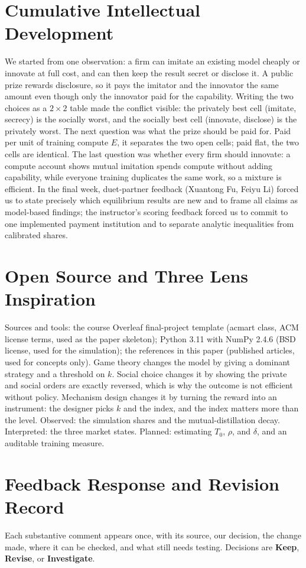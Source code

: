 \section{Cumulative Intellectual Development}
We started from one observation: a firm can imitate an existing model cheaply or innovate at full cost, and can then keep the result secret or disclose it. A public prize rewards disclosure, so it pays the imitator and the innovator the same amount even though only the innovator paid for the capability. Writing the two choices as a $2\times2$ table made the conflict visible: the privately best cell (imitate, secrecy) is the socially worst, and the socially best cell (innovate, disclose) is the privately worst. The next question was what the prize should be paid for. Paid per unit of training compute $E$, it separates the two open cells; paid flat, the two cells are identical. The last question was whether every firm should innovate: a compute account shows mutual imitation spends compute without adding capability, while everyone training duplicates the same work, so a mixture is efficient. In the final week, duet-partner feedback (Xuantong Fu, Feiyu Li) forced us to state precisely which equilibrium results are new and to frame all claims as model-based findings; the instructor's scoring feedback forced us to commit to one implemented payment institution and to separate analytic inequalities from calibrated shares.

\section{Open Source and Three Lens Inspiration}
Sources and tools: the course Overleaf final-project template (acmart class, ACM license terms, used as the paper skeleton); Python 3.11 with NumPy 2.4.6 (BSD license, used for the simulation); the references in this paper (published articles, used for concepts only). Game theory changes the model by giving a dominant strategy and a threshold on $k$. Social choice changes it by showing the private and social orders are exactly reversed, which is why the outcome is not efficient without policy. Mechanism design changes it by turning the reward into an instrument: the designer picks $k$ and the index, and the index matters more than the level. Observed: the simulation shares and the mutual-distillation decay. Interpreted: the three market states. Planned: estimating $T_0$, $\rho$, and $\delta$, and an auditable training measure.

\section{Feedback Response and Revision Record}\label{app:response}
Each substantive comment appears once, with its source, our decision, the change made, where it can be checked, and what still needs testing. Decisions are \textbf{Keep}, \textbf{Revise}, or \textbf{Investigate}.

